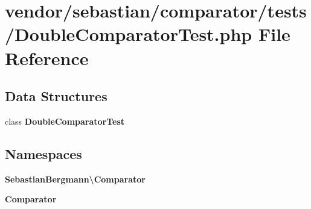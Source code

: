 \section{vendor/sebastian/comparator/tests/\+Double\+Comparator\+Test.php File Reference}
\label{_double_comparator_test_8php}
\subsection*{Data Structures}
\begin{DoxyCompactItemize}
\item 
class {\bf Double\+Comparator\+Test}
\end{DoxyCompactItemize}
\subsection*{Namespaces}
\begin{DoxyCompactItemize}
\item 
 {\bf Sebastian\+Bergmann\textbackslash{}\+Comparator}
\item 
 {\bf Comparator}
\end{DoxyCompactItemize}
